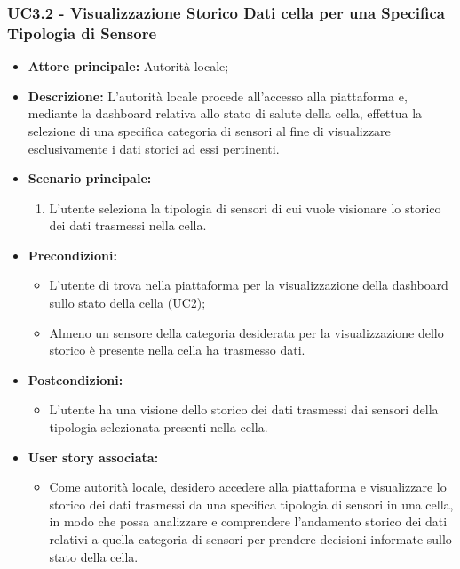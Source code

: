 \subsubsection{UC3.2 - Visualizzazione Storico Dati cella per una Specifica Tipologia di Sensore}
\begin{itemize}
      \item \textbf{Attore principale:} Autorità locale;
      \item \textbf{Descrizione:} L’autorità locale procede all’accesso alla piattaforma e, mediante la dashboard relativa allo stato di salute della cella, effettua la selezione di una specifica categoria di sensori al fine di visualizzare esclusivamente i dati storici ad essi pertinenti.
      \item \textbf{Scenario principale:}
      \begin{enumerate}
            \item L'utente seleziona la tipologia di sensori di cui vuole visionare lo storico dei dati trasmessi nella cella.
      \end{enumerate}
      \item \textbf{Precondizioni:}
      \begin{itemize}
            \item L'utente di trova nella piattaforma per la visualizzazione della dashboard sullo stato della cella (UC2);
            \item  Almeno un sensore della categoria desiderata per la visualizzazione dello storico è presente nella cella ha trasmesso dati.
      \end{itemize}
      \item \textbf{Postcondizioni:}
      \begin{itemize}
            \item  L'utente ha una visione dello storico dei dati trasmessi dai sensori della tipologia selezionata presenti nella cella.
      \end{itemize}
      \item \textbf{User story associata:}
      \begin{itemize}
            \item Come autorità locale, desidero accedere alla piattaforma e visualizzare lo storico dei dati trasmessi da una specifica tipologia di sensori in una cella, in modo che possa analizzare e comprendere l'andamento storico dei dati relativi a quella categoria di sensori per prendere decisioni informate sullo stato della cella.
      \end{itemize}
\end{itemize}
